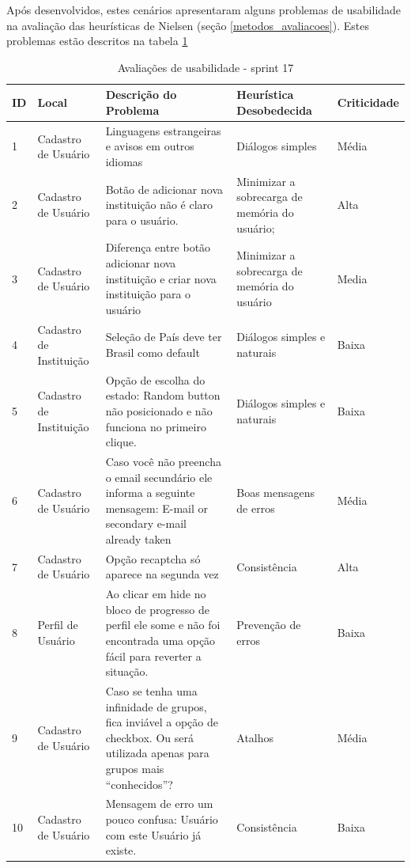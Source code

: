 Após desenvolvidos, estes cenários apresentaram alguns problemas de usabilidade na avaliação das heurísticas de Nielsen (seção \ref{metodos_avaliacoes}). Estes problemas estão descritos na tabela \ref{tabela_1a}

\begin{table}[h!]

\begin{tabular}{|l|p{3cm}|p{6cm}|p{3cm}|l|}
\hline
\textbf{ID} & \textbf{Local} & \textbf{Descrição do Problema}                                                                                     & \textbf{Heurística Desobedecida} & \textbf{Criticidade} \\ \hline
1           & Cadastro de Usuário                 & Linguagens estrangeiras e avisos em outros idiomas & Diálogos simples  & Média                \\ \hline
2           & Cadastro de Usuário      & Botão de adicionar nova instituição não é claro para o usuário.  & Minimizar a sobrecarga de memória do usuário;           & Alta                \\ \hline
3           & Cadastro de Usuário               & Diferença entre botão adicionar nova instituição e criar nova instituição para o usuário  & Minimizar a sobrecarga de memória do usuário & Media                \\ \hline
4           & Cadastro de Instituição             & Seleção de País deve ter Brasil como default  & Diálogos simples e naturais    & Baixa                \\ \hline
5           & Cadastro de Instituição      & Opção de escolha do estado: Random button não posicionado e não funciona no primeiro clique. & Diálogos simples e naturais  & Baixa                \\ \hline
6           & Cadastro de Usuário  & Caso você não preencha o email secundário ele informa a seguinte mensagem: E-mail or secondary e-mail already taken & Boas mensagens de erros                & Média                \\ \hline
7           & Cadastro de Usuário  & Opção recaptcha só aparece na segunda vez & Consistência                     & Alta                \\ \hline
8           & Perfil de Usuário  & Ao clicar em hide no bloco de progresso de perfil ele some e não foi encontrada uma opção fácil para reverter a situação.
 & Prevenção de erros                     & Baixa                \\ \hline
9           & Cadastro de Usuário  & Caso se tenha uma infinidade de grupos, fica inviável a opção de checkbox. Ou será utilizada apenas para grupos mais ``conhecidos''? & Atalhos & Média                \\ \hline
10           & Cadastro de Usuário  & Mensagem de erro um pouco confusa: Usuário com este Usuário já existe.  & Consistência                     & Baixa                \\ \hline
\end{tabular}
\caption{Avaliações de usabilidade - sprint 17}
\label{tabela_1a}
\end{table}


